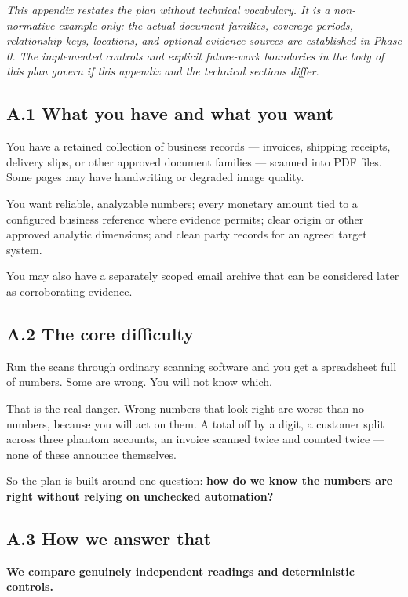 \documentclass[
]{article}
\newcounter{none} %
\begin{document}
\emph{This appendix restates the plan without technical vocabulary. It
is a non-normative example only: the actual document families, coverage
periods, relationship keys, locations, and optional evidence sources are
established in Phase 0. The implemented controls and explicit
future-work boundaries in the body of this plan govern if this appendix
and the technical sections differ.}

\subsection{A.1 What you have and what you
want}\label{a.1-what-you-have-and-what-you-want}

You have a retained collection of business records --- invoices,
shipping receipts, delivery slips, or other approved document families
--- scanned into PDF files. Some pages may have handwriting or degraded
image quality.

You want reliable, analyzable numbers; every monetary amount tied to a
configured business reference where evidence permits; clear origin or
other approved analytic dimensions; and clean party records for an
agreed target system.

You may also have a separately scoped email archive that can be
considered later as corroborating evidence.

\subsection{A.2 The core difficulty}\label{a.2-the-core-difficulty}

Run the scans through ordinary scanning software and you get a
spreadsheet full of numbers. Some are wrong. You will not know which.

That is the real danger. Wrong numbers that look right are worse than no
numbers, because you will act on them. A total off by a digit, a
customer split across three phantom accounts, an invoice scanned twice
and counted twice --- none of these announce themselves.

So the plan is built around one question: \textbf{how do we know the
numbers are right without relying on unchecked automation?}

\subsection{A.3 How we answer that}\label{a.3-how-we-answer-that}

\textbf{We compare genuinely independent readings and deterministic
controls.}
\end{document}
